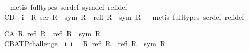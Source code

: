 \begin{isabellebody}
\ %
\endisadelimproof
%
\isatagproof
{}\isamarkupfalse%
\ {\isacharparenleft}metis\ {\isacharparenleft}full{\isacharunderscore}types{\isacharparenright}\ ser{\isacharunderscore}def\ sym{\isacharunderscore}def\ refl{\isacharunderscore}def{\isacharparenright}%
\endisatagproof
{\isafoldproof}%
%
\isadelimproof
\isanewline
%
\endisadelimproof
{}\isamarkupfalse%
\ C{}{}{\isacharunderscore}D{\isacharcolon}\ {\isachardoublequoteopen}{\isacharhash}\ i{}\ {\isasymlongrightarrow}\ {\isacharparenleft}{\isasymforall}R{\isachardot}\ ser\ R\ {\isasymand}\ sym\ R\ {\isasymlongrightarrow}\ {\isacharparenleft}refl\ R\ {\isasymand}\ sym\ R{\isacharparenright}{\isacharparenright}{\isachardoublequoteclose}\isanewline
%
\isadelimproof
\ %
\endisadelimproof
%
\isatagproof
{}\isamarkupfalse%
\ {\isacharparenleft}metis\ {\isacharparenleft}full{\isacharunderscore}types{\isacharparenright}\ ser{\isacharunderscore}def\ refl{\isacharunderscore}def{\isacharparenright}%
\endisatagproof
{\isafoldproof}%
%
\isadelimproof
%
\endisadelimproof
%
\begin{isamarkuptext}%
\begin{isbfig}{7em}
\end{isbfig}%
\end{isamarkuptext}%
\isamarkuptrue%
%
\isamarkuptrue%
\isamarkupfalse%
\ C{}{}{\isacharunderscore}A{\isacharcolon}\ {\isachardoublequoteopen}{\isasymforall}R{\isachardot}\ refl\ R\ {\isasymlongrightarrow}\ {\isacharparenleft}refl\ R\ {\isasymand}\ sym\ R{\isacharparenright}{\isachardoublequoteclose}\ \isamarkupfalse%
%
\isadelimproof
\ %
\endisadelimproof
%
\isatagproof
{}\isamarkupfalse%
%
\endisatagproof
{\isafoldproof}%
%
\isadelimproof
%
\endisadelimproof
\isanewline
{}\isamarkupfalse%
\ C{}{}{\isacharunderscore}B{\isacharunderscore}ATP{\isacharunderscore}challenge{\isacharcolon}\ {\isachardoublequoteopen}{\isacharhash}\ i{}\ i{}\ {\isasymlongrightarrow}\ {\isasymnot}\ {\isacharparenleft}{\isasymforall}R{\isachardot}\ refl\ R\ {\isasymlongrightarrow}\ {\isacharparenleft}refl\ R\ {\isasymand}\ sym\ R{\isacharparenright}{\isacharparenright}{\isachardoublequoteclose}\isanewline

\end{isabellebody}
